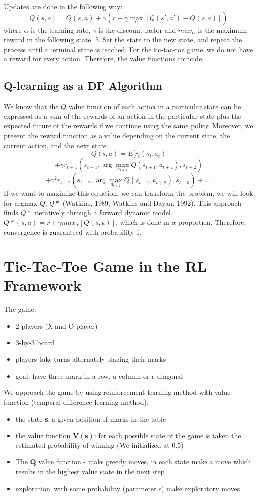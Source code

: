 \documentclass[fleqn]{article}
\begin{document}
Updates are done in the following way:  
$$Q(s,a) =  Q(s,a) + \alpha(r + \gamma \max_{\alpha}[Q(s',a')-Q(s,a)])$$   
where $\alpha$ is the learning rate, $\gamma$ is the discount factor and $max_{\alpha}$ is the maximum reward in the following state.   
5. Set the state to the new state, and repeat the process until a terminal state is reached.  
For the tic-tac-toe game, we do not have a reward for every action. Therefore, the value functions coincide. 

\subsection{Q-learning as a DP Algorithm}
We know that the $Q$ value function of each action in a particular state can be expressed as a sum of the rewards of an action in the particular state plus the expected future of the rewards if we continue using the same policy. Moreover, we present the reward function as a value depending on the current state, the current action, and the next state. 
$$Q(s,a) = E[ r_t(s_t, a_t)$$
$$+ \gamma r_{t+1}(s_{t+1}, \arg \max_{a_{t+1}} Q(s_{t+1}, a_{t+1}), s_{t+2})$$
$$+ \gamma^2r_{t+2}(s_{t+2}, \arg \max_{a_{t+2}} Q(s_{t+1}, a_{t+2}), s_{t+3}) + \dots ]$$
If we want to maximize this equation, we can transform the problem, we will look for argmax $Q$, $Q*$ (Watkins, 1989; Watkins and Dayan, 1992). This approach finds $Q*$ iteratively through a forward dynamic model.   
$Q*(s,a) = r + \gamma max_{\alpha}[Q(s,a)]$, which is done in $\alpha$ proportion. Therefore, convergence is guaranteed with probability 1.

\section{Tic-Tac-Toe Game in the RL Framework}

The game:
\begin{itemize}
	\item  2 players (X and O player)
	\item 3-by-3 board
	\item players take turns alternately placing their marks
	\item goal: have three mark in a row, a column or a diagonal
\end{itemize}

We approach the game by using reinforcement learning method with value function (temporal difference learning method):

\begin{itemize}
	\item  the state \textbf{s}: a given position of marks in the table
	\item the value function $\boldsymbol{V(s)}$: for each possible state of the game is taken the estimated probability of winning (We initialized at 0.5)
	\item The $\boldsymbol{Q}$ value function - make greedy moves, in each state make a move which results in the highest value state in the next step
	\item exploration: with some probability (parameter $\epsilon$) make exploratory moves
\end{itemize}
\end{document}
